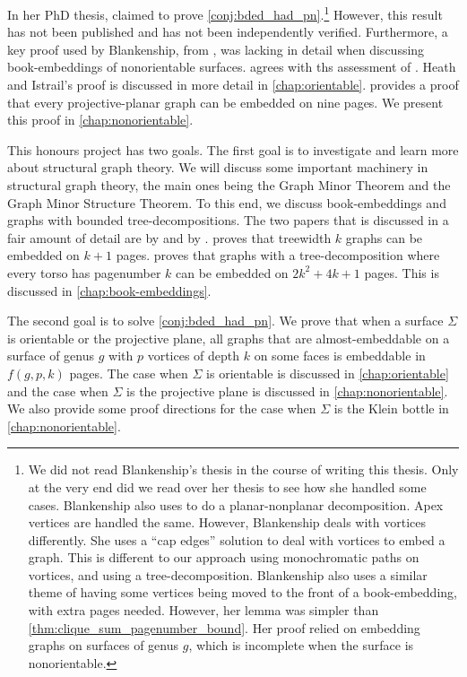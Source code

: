 In her PhD thesis, \textcite{Blankenship-PhD03} claimed to prove \cref{conj:bded_had_pn}.\footnote{
	We did not read Blankenship's thesis in the course of writing this thesis. Only at the very end did we read over her thesis to see how she handled some cases. 
	Blankenship also uses \textcite{heathPagenumberGenusGraphs1992} to do a planar-nonplanar decomposition. Apex vertices are handled the same. However, Blankenship deals with vortices differently. She uses a ``cap edges'' solution to deal with vortices to embed a graph. This is different to our approach using monochromatic paths on vortices, and using a tree-decomposition. 
	Blankenship also uses a similar theme of having some vertices being moved to the front of a book-embedding, with extra pages needed. However, her lemma was simpler than \cref{thm:clique_sum_pagenumber_bound}. Her proof relied on \textcite{heathPagenumberGenusGraphs1992} embedding graphs on surfaces of genus $g$, which is incomplete when the surface is nonorientable. 
} However, this result has not been published and has not been independently verified. Furthermore, a key proof used by Blankenship, from \textcite{heathPagenumberGenusGraphs1992}, was lacking in detail when discussing book-embeddings of nonorientable surfaces. \textcite{nakamotoBookEmbeddingProjectiveplanar2015} agrees with ths assessment of \textcite{heathPagenumberGenusGraphs1992}. Heath and Istrail's proof is discussed in more detail in \cref{chap:orientable}. \textcite{nakamotoBookEmbeddingProjectiveplanar2015} provides a proof that every projective-planar graph can be embedded on nine pages. We present this proof in \cref{chap:nonorientable}. 

This honours project has two goals. The first goal is to investigate and learn more about structural graph theory. We will discuss some important machinery in structural graph theory, the main ones being the Graph Minor Theorem and the Graph Minor Structure Theorem. To this end, we discuss book-embeddings and graphs with bounded tree-decompositions. The two papers that is discussed in a fair amount of detail are by \textcite{hickingbothamStackNumberCliqueSum2023} and by \textcite{ganleyPagenumberTrees2001}. \textcite{ganleyPagenumberTrees2001} proves that treewidth $k$ graphs can be embedded on $k+1$ pages. \textcite{hickingbothamStackNumberCliqueSum2023} proves that graphs with a tree-decomposition where every torso has pagenumber $k$ can be embedded on $2k^2 + 4k + 1$ pages. This is discussed in \cref{chap:book-embeddings}.

The second goal is to solve \cref{conj:bded_had_pn}. We prove that when a surface $\Sigma$ is orientable or the projective plane, all graphs that are almost-embeddable on a surface of genus $g$ with $p$ vortices of depth $k$ on some faces is embeddable in $f(g, p, k)$ pages. The case when $\Sigma$ is orientable is discussed in \cref{chap:orientable} and the case when $\Sigma$ is the projective plane is discussed in \cref{chap:nonorientable}. We also provide some proof directions for the case when $\Sigma$ is the Klein bottle in \cref{chap:nonorientable}. 

